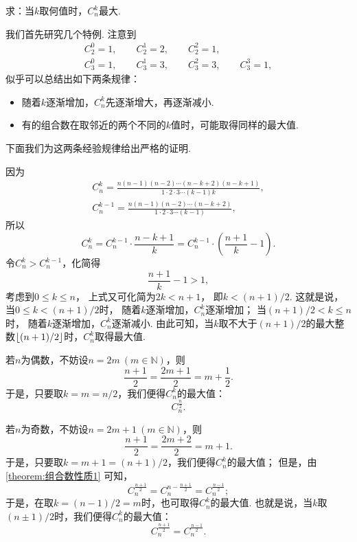\begin{example}
求：当\(k\)取何值时，\(C_n^k\)最大.
\begin{solution}
我们首先研究几个特例.
注意到\begin{gather*}
	C_2^0 = 1, \qquad
	C_2^1 = 2, \qquad
	C_2^2 = 1, \\
	C_3^0 = 1, \qquad
	C_3^1 = 3, \qquad
	C_3^2 = 3, \qquad
	C_3^3 = 1,
\end{gather*}
似乎可以总结出如下两条规律：
\begin{itemize}
	\item 随着\(k\)逐渐增加，\(C_n^k\)先逐渐增大，再逐渐减小.
	\item 有的组合数在取邻近的两个不同的\(k\)值时，可能取得同样的最大值.
\end{itemize}
下面我们为这两条经验规律给出严格的证明.

因为\begin{gather*}
	C_n^k = \frac{n(n-1)(n-2)\dotsm(n-k+2)(n-k+1)}{1\cdot2\cdot3\dotsm(k-1)k}, \\
	C_n^{k-1} = \frac{n(n-1)(n-2)\dotsm(n-k+2)}{1\cdot2\cdot3\dotsm(k-1)},
\end{gather*}
所以\begin{equation*}
	C_n^k = C_n^{k-1} \cdot \frac{n-k+1}{k}
	= C_n^{k-1} \cdot \left( \frac{n+1}{k} - 1 \right).
\end{equation*}
令\(C_n^k > C_n^{k-1}\)，化简得\begin{equation*}
	\frac{n+1}{k} - 1 > 1,
\end{equation*}
考虑到\(0 \leq k \leq n\)，
上式又可化简为\(2k < n+1\)，
即\(k < (n+1)/2\).
这就是说，当\(0 \leq k < (n+1)/2\)时，
随着\(k\)逐渐增加，\(C_n^k\)逐渐增加；
当\((n+1)/2 < k \leq n\)时，
随着\(k\)逐渐增加，\(C_n^k\)逐渐减小.
由此可知，当\(k\)取不大于\((n+1)/2\)的最大整数\(\lfloor(n+1)/2\rfloor\)时，\(C_n^k\)取得最大值.

若\(n\)为偶数，不妨设\(n = 2m\ (m\in\mathbb{N})\)，则\begin{equation*}
	\frac{n+1}{2} = \frac{2m+1}{2}
	= m+\frac{1}{2}.
\end{equation*}
于是，只要取\(k = m = n/2\)，我们便得\(C_n^k\)的最大值：\begin{equation*}
	C_n^{\frac{n}{2}}.
\end{equation*}

若\(n\)为奇数，不妨设\(n = 2m+1\ (m\in\mathbb{N})\)，则\begin{equation*}
	\frac{n+1}{2} = \frac{2m+2}{2} = m+1.
\end{equation*}
于是，只要取\(k = m+1 = (n+1)/2\)，我们便得\(C_n^k\)的最大值；
但是，由\cref{theorem:组合数性质1} 可知，\begin{equation*}
	C_n^{\frac{n+1}{2}}
	= C_n^{n-\frac{n+1}{2}}
	= C_n^{\frac{n-1}{2}};
\end{equation*}
于是，在取\(k = (n-1)/2 = m\)时，也可取得\(C_n^k\)的最大值.
也就是说，当\(k\)取\((n\pm1)/2\)时，我们便得\(C_n^k\)的最大值：\begin{equation*}
	C_n^{\frac{n+1}{2}}
	= C_n^{\frac{n-1}{2}}.
\end{equation*}


\end{solution}
\end{example}
